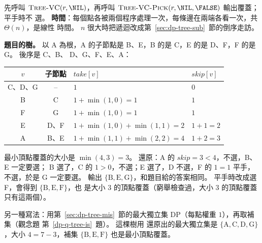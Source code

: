 先呼叫 $\proc{Tree-VC}(r, \NIL)$，再呼叫 $\proc{Tree-VC-Pick}(r, \NIL, \FALSE)$ 輸出覆蓋；平手時不
選。 \textbf{時間}：每個點各被兩個程序處理一次，每條邊在兩端各看一次，共 $\Theta(n)$，是線性
時間。 $n$ 很大時把遞迴改成第~\ref{sec:dp-tree-sub}~節的倒序走訪。

\textbf{題目的樹。} 以 A 為根，A 的子節點是 B、E，B 的是 C，E 的是 D、F，F 的是 G。 後序是 C、B、
D、G、F、E、A：
\begin{center}
\small
\begin{tabular}{ccll}
\toprule
$v$ & 子節點 & $\mathit{take}[v]$ & $\mathit{skip}[v]$ \\
\midrule
C、D、G & -- & $1$ & $0$ \\
B & C & $1 + \min(1, 0) = 1$ & $1$ \\
F & G & $1 + \min(1, 0) = 1$ & $1$ \\
E & D、F & $1 + \min(1, 0) + \min(1, 1) = 2$ & $1 + 1 = 2$ \\
A & B、E & $1 + \min(1, 1) + \min(2, 2) = 4$ & $1 + 2 = 3$ \\
\bottomrule
\end{tabular}
\end{center}
最小頂點覆蓋的大小是 $\min(4, 3) = 3$。 還原：A 的 $\mathit{skip} = 3 < 4$，不選，B、E 一定要選；
B 選了，C 的 $1 > 0$，不選；E 選了，D 不選，F 的 $1 = 1$ 平手，不選，於是 G 一定要選。 輸出
$\{\mathrm{B, E, G}\}$，和題目給的答案相同。 平手時改成選 F，會得到 $\{\mathrm{B, E, F}\}$，也
是大小 $3$ 的頂點覆蓋（窮舉檢查過，大小 $3$ 的頂點覆蓋只有這兩個）。

另一種寫法：用第~\ref{sec:dp-tree-mis}~節的最大獨立集 DP（每點權重 $1$），再取補集（觀念題
第~\ref{dp-q-tree-is}~題）。 這棵樹用  還原出的最大獨立集是
$\{\mathrm{A, C, D, G}\}$，大小 $4 = 7 - 3$，補集 $\{\mathrm{B, E, F}\}$ 也是最小頂點覆蓋。
